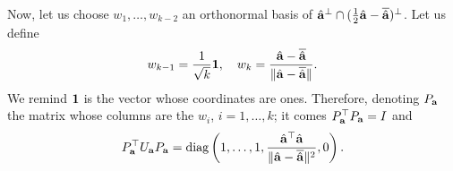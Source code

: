 Now, let us choose $w_1,\dots,w_{k-2}$ an orthonormal basis of $\hat{\mathbf{a}}^\perp\cap(\frac{1}{2}\hat{\mathbf{a}}-\overline{\hat{\mathbf{a}}})^\perp$. Let us define 
\begin{equation}\label{lowdoe:eq:wk-1.wk}
    w_{k-1} = \frac{1}{\sqrt k}\mathbf{1} ,\quad w_{k} = \frac{\hat{\mathbf{a}} - \overline{\hat{\mathbf{a}}}}{\|\hat{\mathbf{a}}-\overline{\hat{\mathbf{a}}}\|}.
\end{equation}
We remind $\mathbf{1}$ is the vector whose coordinates are ones. Therefore, denoting $P_{\mathbf{a}}$ the matrix whose columns are the $w_i$, $i=1,\dots,k$; it comes $P_{\mathbf{a}}^{\top}P_{\mathbf{a}}=I$ and
    \begin{equation}
        P^{\top}_{\mathbf{a}}U_{\mathbf{a}}P_{\mathbf{a}} = \operatorname{diag}\left(1,\dots,1,\frac{\hat{\mathbf{a}}^{\top}\hat{\mathbf{a}}}{\|\hat{\mathbf{a}}-\overline{\hat{\mathbf{a}}}\|^2}, 0\right).
    \end{equation}



